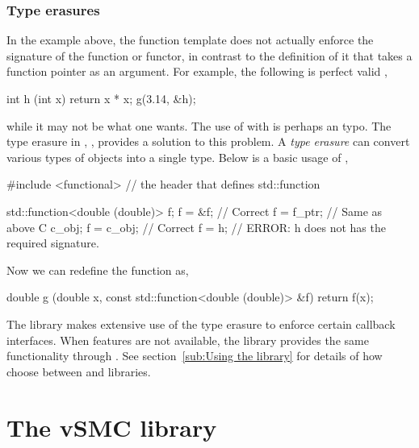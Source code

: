 \subsubsection{Type erasures}
\label{ssub:Type erasures}

In the example above, the function template  does not actually
enforce the signature of the function or functor, in contrast to the
definition of it that takes a function pointer as an argument. For example,
the following is perfect valid \cpp,
\begin{cppcode}
int h (int x) {return x * x};
g(3.14, &h);
\end{cppcode}
while it may not be what one wants. The use of  with
 is perhaps an typo. The type erasure in \cppoo{},
, provides a solution to this problem. A \emph{type
  erasure} can convert various types of objects into a single type. Below is a
basic usage of ,
\begin{cppcode}
#include <functional> // the header that defines std::function

std::function<double (double)> f;
f = &f;    // Correct
f = f_ptr; // Same as above
C c_obj;
f = c_obj; // Correct
f = h;     // ERROR: h does not has the required signature.
\end{cppcode}
Now we can redefine the function  as,
\begin{cppcode}
double g (double x, const std::function<double (double)> &f)
{ return f(x); }
\end{cppcode}

The \vsmc library makes extensive use of the type erasure to enforce certain
callback interfaces. When \cppoo features are not available, the \boost
library provides the same functionality through .
See section~\ref{sub:Using the library} for details of how \vsmc choose
between \cppoo and \boost libraries.

\section{The vSMC library}
\label{sec:The vSMC library}

